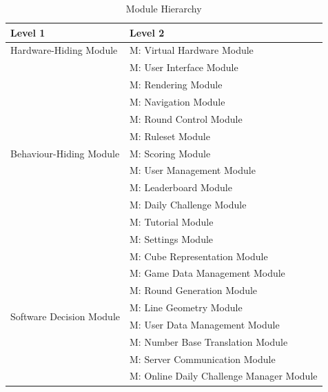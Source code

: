 \documentclass[12pt, titlepage]{article}
\newcounter{mnum}
\newcommand{\mthemnum}{M\themnum}
\begin{document}
\begin{table}[h!]
\centering
\begin{tabular}{p{} p{}}
\toprule
\textbf{Level 1} & \textbf{Level 2}\\
\midrule

Hardware-Hiding Module
&{mnum} \mthemnum \label{mVH}: Virtual Hardware Module\\
\midrule

\multirow{11}{0.3\textwidth}{Behaviour-Hiding Module}
&{mnum} \mthemnum \label{mUI}: User Interface Module\\
&{mnum} \mthemnum \label{mRE}: Rendering Module\\
&{mnum} \mthemnum \label{mN}: Navigation Module\\
&{mnum} \mthemnum \label{mRC}: Round Control Module\\
&{mnum} \mthemnum \label{mR}: Ruleset Module\\
&{mnum} \mthemnum \label{mSC}: Scoring Module\\
&{mnum} \mthemnum \label{mUM}: User Management Module\\
&{mnum} \mthemnum \label{mL}: Leaderboard Module\\
&{mnum} \mthemnum \label{mDC}: Daily Challenge Module\\
&{mnum} \mthemnum \label{mT}: Tutorial Module\\
&{mnum} \mthemnum \label{mSE}: Settings Module\\
\midrule

\multirow{8}{0.3\textwidth}{Software Decision Module}
&{mnum} \mthemnum \label{mCR}: Cube Representation Module\\
&{mnum} \mthemnum \label{mGDM}: Game Data Management Module\\
&{mnum} \mthemnum \label{mRG}: Round Generation Module\\
&{mnum} \mthemnum \label{mTG}: Line Geometry Module\\
&{mnum} \mthemnum \label{mUDM}: User Data Management Module\\
&{mnum} \mthemnum \label{mNBT}: Number Base Translation Module\\
&{mnum} \mthemnum \label{mSCM}: Server Communication Module\\
&{mnum} \mthemnum \label{mDCM}: Online Daily Challenge Manager Module\\
\bottomrule

\end{tabular}
\caption{Module Hierarchy}
\label{TblMH}
\end{table}
\end{document}
